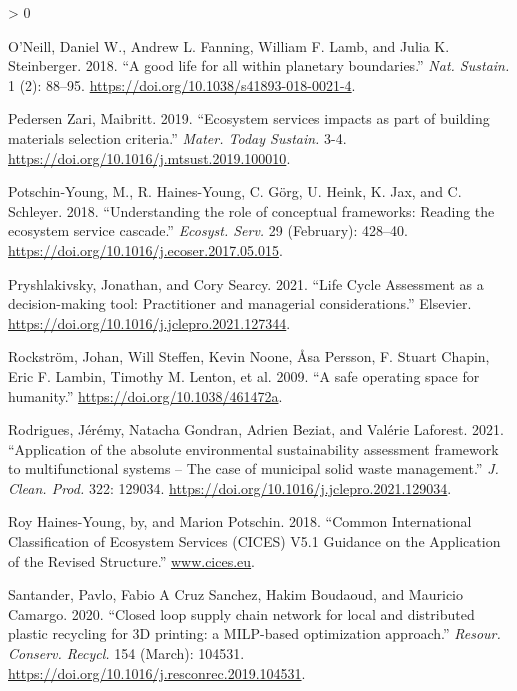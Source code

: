 \documentclass[
]{article}
\newlength{\cslhangindent}
\newenvironment{CSLReferences}[2] %
 {%
  \setlength{\parindent}{0pt}
  \ifodd #1 \everypar{\setlength{\hangindent}{\cslhangindent}}\ignorespaces\fi
  \ifnum #2 > 0
  \setlength{\parskip}{#2\baselineskip}
  \fi
 }%
 {}
\begin{document}
\begin{CSLReferences}{1}{0}
\leavevmode\hypertarget{ref-ONeill2018}{}%
O'Neill, Daniel W., Andrew L. Fanning, William F. Lamb, and Julia K. Steinberger. 2018. {``{A good life for all within planetary boundaries}.''} \emph{Nat. Sustain.} 1 (2): 88--95. \url{https://doi.org/10.1038/s41893-018-0021-4}.

\leavevmode\hypertarget{ref-PedersenZari2019}{}%
Pedersen Zari, Maibritt. 2019. {``{Ecosystem services impacts as part of building materials selection criteria}.''} \emph{Mater. Today Sustain.} 3-4. \url{https://doi.org/10.1016/j.mtsust.2019.100010}.

\leavevmode\hypertarget{ref-Potschin-Young2018}{}%
Potschin-Young, M., R. Haines-Young, C. Görg, U. Heink, K. Jax, and C. Schleyer. 2018. {``{Understanding the role of conceptual frameworks: Reading the ecosystem service cascade}.''} \emph{Ecosyst. Serv.} 29 (February): 428--40. \url{https://doi.org/10.1016/j.ecoser.2017.05.015}.

\leavevmode\hypertarget{ref-Pryshlakivsky2021}{}%
Pryshlakivsky, Jonathan, and Cory Searcy. 2021. {``{Life Cycle Assessment as a decision-making tool: Practitioner and managerial considerations}.''} Elsevier. \url{https://doi.org/10.1016/j.jclepro.2021.127344}.

\leavevmode\hypertarget{ref-Rockstrom2009}{}%
Rockström, Johan, Will Steffen, Kevin Noone, Åsa Persson, F. Stuart Chapin, Eric F. Lambin, Timothy M. Lenton, et al. 2009. {``{A safe operating space for humanity}.''} \url{https://doi.org/10.1038/461472a}.

\leavevmode\hypertarget{ref-Rodrigues2021}{}%
Rodrigues, Jérémy, Natacha Gondran, Adrien Beziat, and Valérie Laforest. 2021. {``{Application of the absolute environmental sustainability assessment framework to multifunctional systems -- The case of municipal solid waste management}.''} \emph{J. Clean. Prod.} 322: 129034. \url{https://doi.org/10.1016/j.jclepro.2021.129034}.

\leavevmode\hypertarget{ref-RoyHaines-Young2018}{}%
Roy Haines-Young, by, and Marion Potschin. 2018. {``{Common International Classification of Ecosystem Services (CICES) V5.1 Guidance on the Application of the Revised Structure}.''} \href{https://www.cices.eu}{www.cices.eu}.

\leavevmode\hypertarget{ref-Santander2020}{}%
Santander, Pavlo, Fabio A Cruz Sanchez, Hakim Boudaoud, and Mauricio Camargo. 2020. {``{Closed loop supply chain network for local and distributed plastic recycling for 3D printing: a MILP-based optimization approach}.''} \emph{Resour. Conserv. Recycl.} 154 (March): 104531. \url{https://doi.org/10.1016/j.resconrec.2019.104531}.


\end{CSLReferences}
\end{document}
